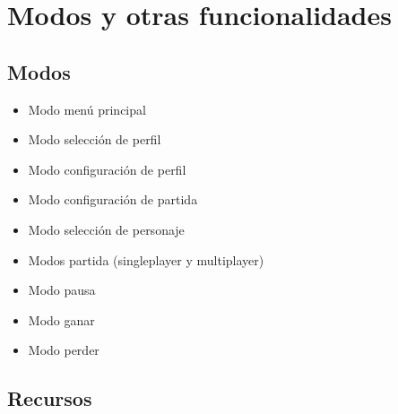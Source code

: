 \section{Modos y otras funcionalidades} %


\subsection{Modos}
\begin{itemize}
    \item Modo menú principal
    \item Modo selección de perfil
    \item Modo configuración de perfil
    \item Modo configuración de partida
    \item Modo selección de personaje
    \item Modos partida (singleplayer y multiplayer)
    \item Modo pausa
    \item Modo ganar
    \item Modo perder
\end{itemize}


\subsection{Recursos}


